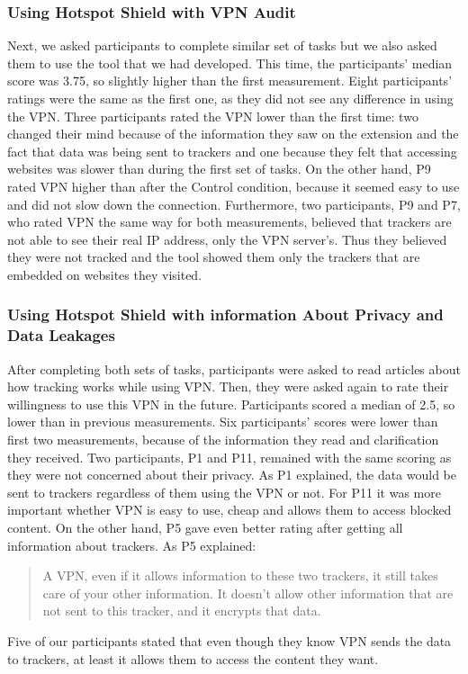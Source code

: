 \subsubsection{Using Hotspot Shield with VPN Audit}

Next, we asked participants to complete similar set of tasks but we also asked
them to use the tool that we had developed. This time, the participants'
median score was  3.75, so slightly higher than the first measurement. Eight
participants' ratings were the same as the first one, as they did not see any
difference in using the VPN. Three participants rated the VPN lower than the
first time: two changed their mind because of the information they saw on the
extension and the fact that data was being sent to trackers and one because
they felt that accessing websites was slower than during the first set of
tasks.  On the other hand, P9 rated VPN higher than after the Control
condition, because it seemed easy to use and did not slow down the connection.
Furthermore, two participants, P9 and P7, who rated VPN the same way for both
measurements, believed that trackers are not able to see their real IP
address, only the VPN server’s. Thus they believed they were not tracked and
the tool showed them only the trackers that are embedded on websites they
visited. 

\subsubsection{Using Hotspot Shield with information About Privacy and Data Leakages} 

After completing both sets of tasks, participants were asked to read articles
about how tracking works while using VPN. Then, they were asked again to rate
their willingness to use this VPN in the future. Participants scored a median
of 2.5, so lower than in previous measurements. Six participants' scores were
lower than first two measurements, because of the information they read and
clarification they received. Two participants, P1 and P11, remained with the
same scoring as they were not concerned about their privacy. As P1 explained,
the data would be sent to trackers regardless of them using the VPN or not.
For P11 it was more important whether VPN is easy to use, cheap and allows
them to access blocked content. On the other hand, P5 gave even better rating
after getting all information about trackers. As P5 explained:

\begin{quote}A VPN, even if it allows information to these two trackers, it
still takes care of your other information. It doesn't allow other information
that are not sent to this tracker, and it encrypts that data.\end{quote} Five
of our participants stated that even though they know VPN sends the data to
trackers, at least it allows them to access the content they want.   


